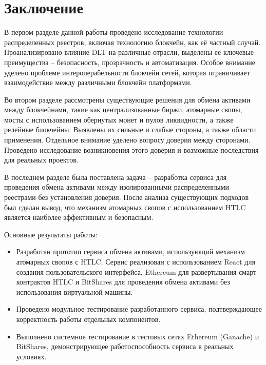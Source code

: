\chapter*{Заключение}

В первом разделе данной работы проведено исследование технологии распределенных реестров, включая технологию блокчейн, как её частный случай. Проанализировано влияние DLT на различные отрасли, выделены её ключевые преимущества – безопасность, прозрачность и автоматизация. Особое внимание уделено проблеме интероперабельности блокчейн сетей, которая ограничивает взаимодействие между различными блокчейн платформами.

Во втором разделе рассмотрены существующие решения для обмена активами между блокчейнами, такие как централизованные биржи, атомарные свопы, мосты с использованием обернутых монет и пулов ликвидности, а также релейные блокчейны. Выявлены их сильные и слабые стороны, а также области применения. Отдельное внимание уделено вопросу доверия между сторонами. Проведено исследование возникновения этого доверия и возможные последствия для реальных проектов.

В последнем разделе была поставлена задача -- разработка сервиса для проведения обмена активами между изолированными распределенными реестрами без установления доверия. После анализа существующих подходов был сделан вывод, что механизм атомарных свопов с использованием HTLC является наиболее эффективным и безопасным.

Основные результаты работы:
\begin{itemize}
\item Разработан прототип сервиса обмена активами, использующий механизм атомарных свопов с HTLC. Сервис реализован с использованием React для создания пользовательского интерфейса, Ethereum для развертывания смарт-контрактов HTLC и BitShares для проведения обмена активами без использования виртуальной машины.

\item Проведено модульное тестирование разработанного сервиса, подтверждающее корректность работы отдельных компонентов.

\item Выполнено системное тестирование в тестовых сетях Ethereum (Ganache) и BitShares, демонстрирующее работоспособность сервиса в реальных условиях.
\end{itemize}

